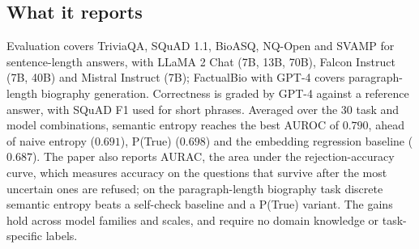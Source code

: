 \subsection{What it reports}

Evaluation covers TriviaQA, SQuAD 1.1, BioASQ, NQ-Open and SVAMP for sentence-length answers, with LLaMA 2 Chat (7B, 13B, 70B), Falcon Instruct (7B, 40B) and Mistral Instruct (7B); FactualBio with GPT-4 covers paragraph-length biography generation. Correctness is graded by GPT-4 against a reference answer, with SQuAD F1 used for short phrases. Averaged over the 30 task and model combinations, semantic entropy reaches the best AUROC of $0.790$, ahead of naive entropy ($0.691$), P(True) ($0.698$) and the embedding regression baseline ($0.687$). The paper also reports AURAC, the area under the rejection-accuracy curve, which measures accuracy on the questions that survive after the most uncertain ones are refused; on the paragraph-length biography task discrete semantic entropy beats a self-check baseline and a P(True) variant. The gains hold across model families and scales, and require no domain knowledge or task-specific labels.


